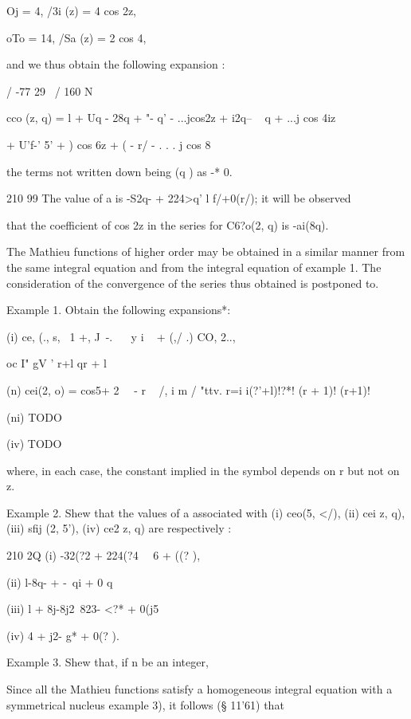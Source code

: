 Oj = 4, /3i (z) = 4 cos 2z,

oTo = 14, /Sa (z) = 2 cos 4,

and we thus obtain the following expansion :

/ -77 29 \ / 160 N

cco (z, q) = l + Uq - 28q + "- q' - ...jcos2z + i2q-- ~ q + ...j cos
4iz

+ U'f-' 5' +  ) cos 6z + ( - r/ - . . . j cos 8

the terms not written down being (q ) as -* 0.

210 99 The value of a is -S2q- + 224>q' l f/+0(r/); it will be
observed

that the coefficient of cos 2z in the series for C6?o(2, q) is
-ai(8q).

%
%

The Mathieu functions of higher order may be obtained in a similar
manner from the same integral equation and from the integral equation
of example 1. The consideration of the convergence of the
series thus obtained is postponed to.

Example 1. Obtain the following expansions*:

(i) ce, (., s, \ 1 +, J\ -. ~ \ y i ~ + (,/  .) CO, 2..,

oc I" gV ' r+l qr + l

(n) cei(2, o) = cos5+ 2 \ \ - r ~ /, i m / "ttv. r=i i(?'+l)!?*! (r +
1)! (r+1)!

(ni) TODO

(iv) TODO

where, in each case, the constant implied in the symbol depends on r
but not on z.


Example 2. Shew that the values of a associated with (i) ceo(5, </),
(ii) cei z, q), (iii) sfij (2, 5'), (iv) ce2 z, q) are respectively :

210 2Q (i) -32(?2 + 224(?4 \ \, 6 + ((? ),

(ii) l-8q- + -\ qi + 0 q%

(iii) l + 8j-8j2\ 823- <?* + 0(j5

(iv) 4 + j2- g* + 0(? ). 

Example 3. Shew that, if n be an integer,


Since all the Mathieu functions satisfy a homogeneous integral
equation with a symmetrical nucleus  example 3), it follows (§
11'61) that

